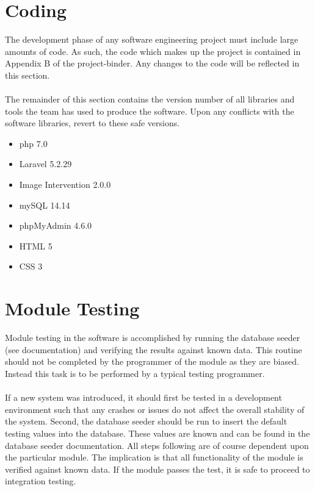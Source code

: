 \documentclass[14pt]{article}
\begin{document}
\section{Coding}
The development phase of any software engineering project must include large amounts of code. As such, the code which makes up the project is contained in Appendix B of the project-binder. Any changes to the code will be reflected in this section.\\ \\
The remainder of this section contains the version number of all libraries and tools the team has used to produce the software. Upon any conflicts with the software libraries, revert to these safe versions.
\begin{itemize}
	\item php 7.0
	\item Laravel 5.2.29
	\item Image Intervention 2.0.0
	\item mySQL 14.14
	\item phpMyAdmin 4.6.0
	\item HTML 5
	\item CSS 3
\end{itemize}

\section{Module Testing}
Module testing in the software is accomplished by running the database seeder (see documentation) and verifying the results against known data. This routine should not be completed by the programmer of the module as they are biased. Instead this task is to be performed by a typical testing programmer.\\ \\
If a new system was introduced, it should first be tested in a development environment such that any crashes or issues do not affect the overall stability of the system. Second, the database seeder should be run to insert the default testing values into the database. These values are known and can be found in the database seeder documentation. All steps following are of course dependent upon the particular module. The implication is that all functionality of the module is verified against known data. If the module passes the test, it is safe to proceed to integration testing.
\end{document}
